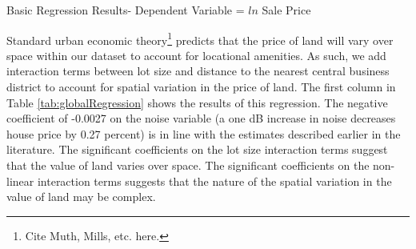 \documentclass{article}\usepackage{graphicx, color}
\begin{document}
\begin{table}
\caption{Basic Regression Results- Dependent Variable = $ln$ Sale Price}\label{tab:globalRegression}

\end{table}

Standard urban economic theory\footnote{Cite Muth, Mills, etc. here.} predicts that the price of land will vary over space within our dataset to account for locational amenities. As such, we add interaction terms between lot size and distance to the nearest central business district to account for spatial variation in the price of land. The first column in Table \ref{tab:globalRegression} shows the results of this regression. The negative coefficient of -0.0027 on the noise variable (a one dB increase in noise decreases house price by 0.27 percent) is in line with the estimates described earlier in the literature. The significant coefficients on the lot size interaction terms suggest that the value of land varies over space. The significant coefficients on the non-linear interaction terms suggests that the nature of the spatial variation in the value of land may be complex.
\end{document}
